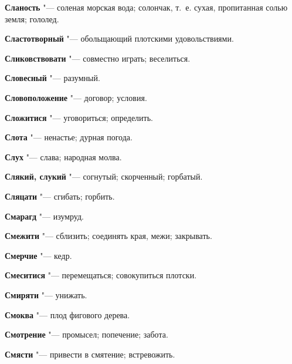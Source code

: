 \begin{mymulticols}{2}
\noindent\textbf{Сланость} "--- соленая морская вода; солончак, т.~е. сухая, пропитанная солью земля; гололед. 




\noindent\textbf{Сластотворный} "--- обольщающий плотскими удовольствиями. 




\noindent\textbf{Сликовствовати} "--- совместно играть; веселиться. 




\noindent\textbf{Словесный} "--- разумный. 




\noindent\textbf{Словоположение} "--- договор; условия. 




\noindent\textbf{Сложитися} "--- уговориться; определить. 




\noindent\textbf{Слота} "--- ненастье; дурная погода. 




\noindent\textbf{Слух} "--- слава; народная молва. 




\noindent\textbf{Слякий, слукий} "--- согнутый; скорченный; горбатый. 




\noindent\textbf{Сляцати} "--- сгибать; горбить. 




\noindent\textbf{Смарагд} "--- изумруд. 




\noindent\textbf{Смежити} "--- сблизить; соединять края, межи; закрывать. 




\noindent\textbf{Смерчие} "--- кедр. 




\noindent\textbf{Смеситися} "--- перемещаться; совокупиться плотски. 




\noindent\textbf{Смиряти} "--- унижать. 




\noindent\textbf{Смоква} "--- плод фигового дерева. 




\noindent\textbf{Смотрение} "--- промысел; попечение; забота. 




\noindent\textbf{Смясти} "--- привести в смятение; встревожить. 





\end{mymulticols}
